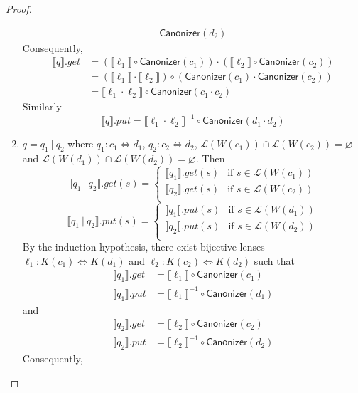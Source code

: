 \documentclass[acmsmall,review,anonymous]{acmart}\settopmatter{printfolios=true,printccs=false,printacmref=false}
\newcommand{\kw}[1]{\ensuremath{\mathsf{#1}}}
\newcommand{\sep}{\ensuremath{\ | \ }}
\newcommand{\canonizer}{\ensuremath{\kw{Canonizer}}}
\begin{document}
\begin{proof}
\begin{enumerate}
\begin{align*}
\canonizer(d_2)
\end{align*}
Consequently,
\begin{align*}
\llbracket q \rrbracket.get &= (\llbracket \ell_1 \rrbracket \circ
\canonizer(c_1)) \cdot  (\llbracket \ell_2 \rrbracket \circ
\canonizer(c_2))\\
&= (\llbracket \ell_1 \rrbracket \cdot \llbracket \ell_2
\rrbracket) \circ (\canonizer(c_1) \cdot \canonizer(c_2))\\
&= \llbracket \ell_1 \cdot  \ell_2 \rrbracket \circ \canonizer(c_1 \cdot c_2)
\end{align*}
Similarly
$$
\llbracket q \rrbracket.put = \llbracket \ell_1 \cdot  \ell_2 \rrbracket^{-1}
\circ \canonizer(d_1 \cdot d_2) $$
\item
$q = q_1 \sep q_2$ where $q_1 : c_1 \Leftrightarrow d_1 $, $q_2 : c_2
\Leftrightarrow d_2$, $\mathcal{L}(W(c_1)) \cap \mathcal{L}(W(c_2)) =
\varnothing$ and $\mathcal{L}(W(d_1)) \cap \mathcal{L}(W(d_2)) = \varnothing$.
Then
$$
\llbracket q_1 \sep q_2 \rrbracket.get(s) =
\begin{cases}
\llbracket q_1 \rrbracket.get (s) & \text{if } s \in \mathcal{L}(W(c_1))\\
\llbracket q_2 \rrbracket.get (s) & \text{if } s \in \mathcal{L}(W(c_2))\\
\end{cases}$$
$$\llbracket q_1 \sep q_2 \rrbracket.put(s) =
\begin{cases}
\llbracket q_1 \rrbracket.put (s) & \text{if } s \in \mathcal{L}(W(d_1))\\
\llbracket q_2 \rrbracket.put (s) & \text{if } s \in \mathcal{L}(W(d_2))\\
\end{cases}
$$
By the induction hypothesis, there exist bijective lenses $\ell_1 : K(c_1)
\Leftrightarrow K(d_1)$ and $\ell_2 : K(c_2) \Leftrightarrow K(d_2)$ such that
\begin{align*}
\llbracket q_1 \rrbracket.get &= \llbracket \ell_1 \rrbracket \circ
\canonizer(c_1)\\
\llbracket q_1 \rrbracket.put &= {\llbracket \ell_1 \rrbracket}^{-1} \circ
\canonizer(d_1)
\end{align*}
and
\begin{align*}
\llbracket q_2 \rrbracket.get &= \llbracket \ell_2 \rrbracket \circ
\canonizer(c_2)\\
\llbracket q_2 \rrbracket.put &= {\llbracket \ell_2 \rrbracket}^{-1} \circ
\canonizer(d_2)
\end{align*}
Consequently,

\end{enumerate}
\end{proof}
\end{document}
